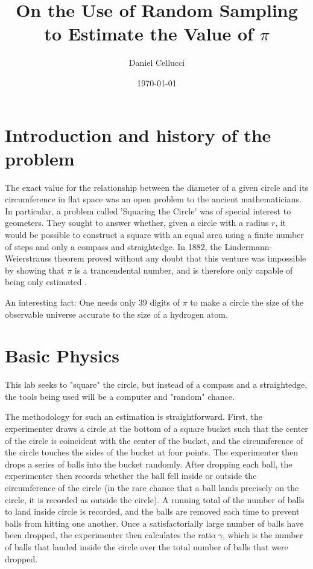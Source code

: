 \documentclass[twocolumn,prb,amsmath,amssymb,amsfonts]{revtex4}
\begin{document}
\title{On the Use of Random Sampling to Estimate the Value of $\pi$}

\author{Daniel Cellucci}

\date{\today}

\begin{abstract}

\end{abstract}

\maketitle
\section{Introduction and history of the problem}
The exact value for the relationship between the diameter of a given circle and its circumference in flat space was an open problem to the ancient mathematicians. In particular, a problem called 'Squaring the Circle' was of special interest to geometers. They sought to answer whether, given a circle with a radius $r$, it would be possible to construct a square with an equal area using a finite number of steps and only a compass and straightedge. In 1882, the Lindermann-Weierstrauss theorem proved without any doubt that this venture was impossible by showing that $\pi$ is a trancendental number, and is therefore only capable of being only estimated .
 
An interesting fact: One needs only 39 digits of $\pi$ to make a circle the size of the observable universe accurate to the size of a hydrogen atom.

\section{Basic Physics}
This lab seeks to "square" the circle, but instead of a compass and a straightedge, the tools being used will be a computer and "random" chance. 

The methodology for such an estimation is straightforward. First, the experimenter draws a circle at the bottom of a square bucket such that the center of the circle is coincident with the center of the bucket, and the circumference of the circle touches the sides of the bucket at four points. The experimenter then drops a series of balls into the bucket randomly. After dropping each ball, the experimenter then records whether the ball fell inside or outside the circumference of the circle (in the rare chance that a ball lands precisely on the circle, it is recorded as outside the circle). A running total of the number of balls to land inside circle is recorded, and the balls are removed each time to prevent balls from hitting one another. Once a satisfactorially large number of balls have been dropped, the experimenter then calculates the ratio $\gamma$, which is the number of balls that landed inside the circle over the total number of balls that were dropped.
\end{document}

